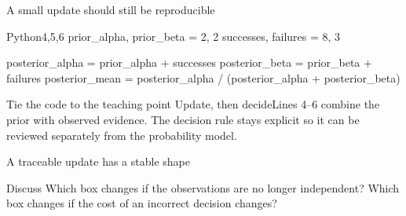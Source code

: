 
\begin{frame}[fragile]{A small update should still be reproducible}
  \begin{HighlightedCodeBlock}[numbers=left]{Python}{4,5,6}
prior_alpha, prior_beta = 2, 2
successes, failures = 8, 3

posterior_alpha = prior_alpha + successes
posterior_beta = prior_beta + failures
posterior_mean = posterior_alpha / (posterior_alpha + posterior_beta)
  \end{HighlightedCodeBlock}
\end{frame}

\begin{frame}[fragile]{Tie the code to the teaching point}
    {Update, then decide}{Lines 4--6 combine the prior with observed evidence. The decision rule stays explicit so it can be reviewed separately from the probability model.}
\end{frame}

\begin{frame}{A traceable update has a stable shape}
  \centering
  \vspace{.34cm}
  \begin{ExerciseCard}{Discuss}
    Which box changes if the observations are no longer independent? Which box changes if the cost of an incorrect decision changes?
  \end{ExerciseCard}
\end{frame}
